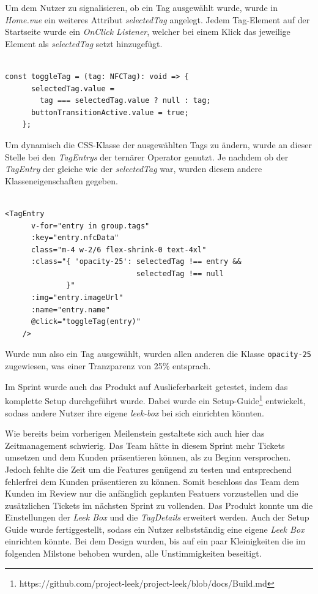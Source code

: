 \documentclass[10pt, a4paper]{article}
\begin{document}
\begin{onehalfspace}
Um dem Nutzer zu signalisieren, ob ein Tag ausgewählt wurde, wurde in \textit{Home.vue} ein weiteres Attribut \textit{selectedTag} angelegt.
Jedem Tag-Element auf der Startseite wurde ein \textit{OnClick Listener}, welcher bei einem Klick das jeweilige Element als \textit{selectedTag} setzt hinzugefügt.
\\~\\
\begin{minipage}{\textwidth}
  \begin{lstlisting}[caption={Hervorgeben aus ausgewähltem NFC-Tag}, captionpos=b]
    const toggleTag = (tag: NFCTag): void => {
      selectedTag.value =
        tag === selectedTag.value ? null : tag;
      buttonTransitionActive.value = true;
    };
  \end{lstlisting}
\end{minipage}
Um dynamisch die CSS-Klasse der ausgewählten Tags zu ändern, wurde an dieser Stelle bei den \textit{TagEntrys} der ternärer Operator genutzt.
Je nachdem ob der \textit{TagEntry} der gleiche wie der \textit{selectedTag} war, wurden diesem andere Klasseneigenschaften gegeben.
\\~\\
\begin{minipage}{\textwidth}
  \begin{lstlisting}[caption={Caption}, captionpos=b]
    <TagEntry
      v-for="entry in group.tags"
      :key="entry.nfcData"
      class="m-4 w-2/6 flex-shrink-0 text-4xl"
      :class="{ 'opacity-25': selectedTag !== entry &&
                              selectedTag !== null
              }"
      :img="entry.imageUrl"
      :name="entry.name"
      @click="toggleTag(entry)"
    />
  \end{lstlisting}
\end{minipage}
Wurde nun also ein Tag ausgewählt, wurden allen anderen die Klasse \lstinline{opacity-25} zugewiesen, was einer Tranzparenz von 25\% entsprach.

Im Sprint wurde auch das Produkt auf Auslieferbarkeit getestet, indem das komplette Setup durchgeführt wurde.
Dabei wurde ein Setup-Guide\footnote{https://github.com/project-leek/project-leek/blob/docs/Build.md} entwickelt, sodass andere Nutzer ihre eigene \textit{leek-box} bei sich einrichten könnten.

Wie bereits beim vorherigen Meilenstein gestaltete sich auch hier das Zeitmanagement schwierig.
Das Team hätte in diesem Sprint mehr Tickets umsetzen und dem Kunden präsentieren können, als zu Beginn versprochen. Jedoch fehlte die Zeit um die Features genügend zu testen und entsprechend fehlerfrei dem Kunden präsentieren zu können.
Somit beschloss das Team dem Kunden im Review nur die anfänglich geplanten Featuers vorzustellen und die zusätzlichen Tickets im nächsten Sprint zu vollenden.
Das Produkt konnte um die Einstellungen der \textit{Leek Box} und die \textit{TagDetails}  erweitert werden.
Auch der Setup Guide wurde fertiggestellt, sodass ein Nutzer selbstständig eine eigene \textit{Leek Box} einrichten könnte.
Bei dem Design wurden, bis auf ein paar Kleinigkeiten die im folgenden Milstone behoben wurden, alle Unstimmigkeiten beseitigt.


\end{onehalfspace}
\end{document}
